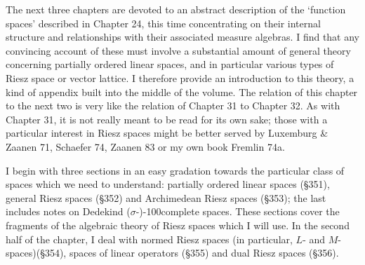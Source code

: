 
\def\chaptername{Riesz spaces} 
\def\sectionname{Introduction} 
 
 
The next three chapters are devoted to an abstract description of the 
`function spaces' described in Chapter 24, this time concentrating on 
their internal structure and relationships with their associated 
measure algebras.   I find that any convincing account of these must 
involve a substantial amount of general theory concerning partially 
ordered linear spaces, and in particular various types of Riesz space or 
vector lattice.   I therefore provide an introduction to this theory, a 
kind of appendix built into the middle of the volume.   The relation of 
this chapter to the next two is very like the relation of Chapter 31 to 
Chapter 32.   As with Chapter 31, it is not really meant to be read for 
its own sake;  those with a particular interest in Riesz spaces might be 
better served by {\smc Luxemburg \& Zaanen 71}, {\smc Schaefer 74}, 
{\smc Zaanen 83} or my own book {\smc Fremlin 74a}. 
 
I begin with three sections in an easy gradation towards the particular 
class of spaces which we need to understand:  partially ordered linear 
spaces (\S351), general Riesz spaces (\S352) and Archimedean Riesz 
spaces (\S353);  the last includes notes on Dedekind 
($\sigma$-\nobreak)\penalty-100complete 
spaces.   These sections cover the fragments of the algebraic theory of 
Riesz spaces which I will use.   In the second half of the chapter, I deal 
with normed Riesz spaces (in particular, $L$- and $M$-spaces)(\S354), 
spaces of linear operators (\S355) and dual Riesz spaces (\S356). 
 
\discrpage 
 
 
